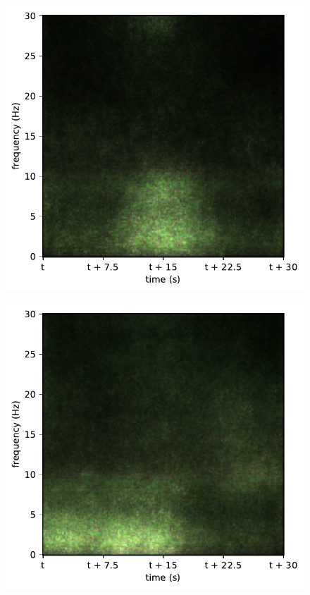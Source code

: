 \begin{subfigure}{.16\textwidth}
  \centering
  \includegraphics[width=1\linewidth]{./pics/class_rnn_0}
  \caption{}
  \label{fig_1_31}
\end{subfigure}%
\begin{subfigure}{.16\textwidth}
  \centering
  \includegraphics[width=1\linewidth]{./pics/class_rnn_1}
  \caption{}
  \label{fig_1_32}
\end{subfigure}%
